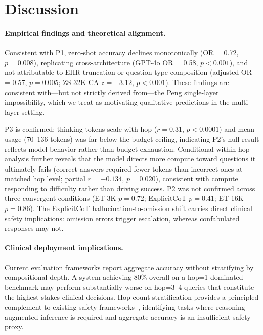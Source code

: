 \documentclass{article}
\begin{document}
\section{Discussion}

\paragraph{Empirical findings and theoretical alignment.}
Consistent with P1, zero-shot accuracy declines monotonically (OR = 0.72, $p = 0.008$), replicating cross-architecture (GPT-4o OR = 0.58, $p < 0.001$), and not attributable to EHR truncation or question-type composition (adjusted OR = 0.57, $p = 0.005$; ZS-32K CA $z = -3.12$, $p < 0.001$). These findings are consistent with---but not strictly derived from---the Peng single-layer impossibility, which we treat as motivating qualitative predictions in the multi-layer setting.

P3 is confirmed: thinking tokens scale with hop ($r = 0.31$, $p < 0.0001$) and mean usage (70--136 tokens) was far below the budget ceiling, indicating P2's null result reflects model behavior rather than budget exhaustion. Conditional within-hop analysis further reveals that the model directs more compute toward questions it ultimately fails (correct answers required fewer tokens than incorrect ones at matched hop level; partial $r = -0.134$, $p = 0.020$), consistent with compute responding to difficulty rather than driving success. P2 was not confirmed across three convergent conditions (ET-3K $p = 0.72$; ExplicitCoT $p = 0.41$; ET-16K $p = 0.86$). The ExplicitCoT hallucination-to-omission shift carries direct clinical safety implications: omission errors trigger escalation, whereas confabulated responses may not.

\paragraph{Clinical deployment implications.}
Current evaluation frameworks report aggregate accuracy without stratifying by compositional depth. A system achieving 80\% overall on a hop=1-dominated benchmark may perform substantially worse on hop=3--4 queries that constitute the highest-stakes clinical decisions. Hop-count stratification provides a principled complement to existing safety frameworks~\citep{noharm2025}, identifying tasks where reasoning-augmented inference is required and aggregate accuracy is an insufficient safety proxy.
\end{document}
